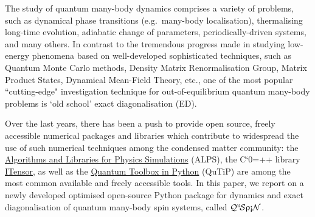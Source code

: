 \documentclass{SciPost}
\newcommand\0{\scalebox{-1}[1]{0}}
\let\svttfamily\ttfamily
\renewcommand\ttfamily{\svttfamily\catcode`0=\active }
\renewcommand\texttt{\bgroup\ttfamily\texttthelp}
\def\texttthelp#1{#1\egroup}
\newcommand{\qspin}{$\mathcal{Q}^{\mathrm{u}}\!\mathcal{S}\uprho\mathrm{\text{\textexclamdown}}\mathcal{N}$}
\newcommand*{\cyan}{\textcolor{cyan}}
\begin{document}

The study of quantum many-body dynamics comprises a variety of problems, such as dynamical phase transitions (e.g.~many-body localisation), thermalising long-time evolution, adiabatic change of parameters, periodically-driven systems, and many others. In contrast to the tremendous progress made in studying low-energy phenomena based on well-developed sophisticated techniques, such as Quantum Monte Carlo methods, Density Matrix Renormalisation Group, Matrix Product States, Dynamical Mean-Field Theory, etc., one of the most popular ``cutting-edge" investigation technique for out-of-equilibrium quantum many-body problems is `old school' exact diagonalisation (ED). 

Over the last years, there has been a push to provide open source, freely accessible numerical packages and libraries which contribute to widespread the use of such numerical techniques among the condensed matter community: the \href{http://alps.comp-phys.org/mediawiki/index.php/Main_Page}{Algorithms and Libraries for Physics Simulations} (ALPS), the C\texttt{++} library \href{http://itensor.org/}{ITensor}, as well as the \href{http://qutip.org/}{Quantum Toolbox in Python} (QuTiP) are among the most common available and freely accessible tools. In this paper, we report on a newly developed optimised open-source Python package for dynamics and exact diagonalisation of quantum many-body spin systems, called \qspin. 
\end{document}
